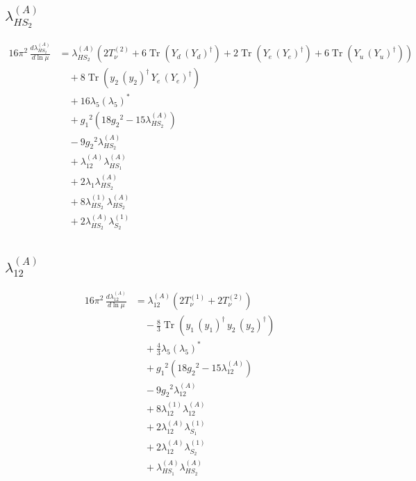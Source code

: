 \documentclass[10pt,a4paper]{article}
\begin{document}
\subsection*{$\lambda_{HS_2}^{(A)}$}
\begin{align*}
16\pi^2\,\frac{d \lambda_{HS_2}^{(A)}}{d\ln\mu} &={\lambda_{HS_2}^{(A)}} (2 T_{\nu}^{(2)}+6 \operatorname{Tr}\!\left({Y_d}\,\left({Y_d}\right)^{\dagger}\right)+2 \operatorname{Tr}\!\left({Y_e}\,\left({Y_e}\right)^{\dagger}\right)+6 \operatorname{Tr}\!\left({Y_u}\,\left({Y_u}\right)^{\dagger}\right)) \\
&\quad +8 \operatorname{Tr}\!\left({y_2}\,\left({y_2}\right)^{\dagger}\,{Y_e}\,\left({Y_e}\right)^{\dagger}\right) \\
&\quad +16 {\lambda_5} \left({\lambda_5}\right)^{*} \\
&\quad +{g_1}^2 \left(18 {g_2}^2-15 {\lambda_{HS_2}^{(A)}}\right) \\
&\quad -9 {g_2}^2 {\lambda_{HS_2}^{(A)}} \\
&\quad +{\lambda_{12}^{(A)}} {\lambda_{HS_1}^{(A)}} \\
&\quad +2 {\lambda_1} {\lambda_{HS_2}^{(A)}} \\
&\quad +8 {\lambda_{HS_2}^{(1)}} {\lambda_{HS_2}^{(A)}} \\
&\quad +2 {\lambda_{HS_2}^{(A)}} {\lambda_{S_2}^{(1)}} \\
\end{align*}
\subsection*{$\lambda_{12}^{(A)}$}
\begin{align*}
16\pi^2\,\frac{d \lambda_{12}^{(A)}}{d\ln\mu} &={\lambda_{12}^{(A)}} (2 T_{\nu}^{(1)}+2 T_{\nu}^{(2)}) \\
&\quad -\frac{8}{3} \operatorname{Tr}\!\left({y_1}\,\left({y_1}\right)^{\dagger}\,{y_2}\,\left({y_2}\right)^{\dagger}\right) \\
&\quad +\frac{4}{3} {\lambda_5} \left({\lambda_5}\right)^{*} \\
&\quad +{g_1}^2 \left(18 {g_2}^2-15 {\lambda_{12}^{(A)}}\right) \\
&\quad -9 {g_2}^2 {\lambda_{12}^{(A)}} \\
&\quad +8 {\lambda_{12}^{(1)}} {\lambda_{12}^{(A)}} \\
&\quad +2 {\lambda_{12}^{(A)}} {\lambda_{S_1}^{(1)}} \\
&\quad +2 {\lambda_{12}^{(A)}} {\lambda_{S_2}^{(1)}} \\
&\quad +{\lambda_{HS_1}^{(A)}} {\lambda_{HS_2}^{(A)}} \\
\end{align*}
\end{document}
